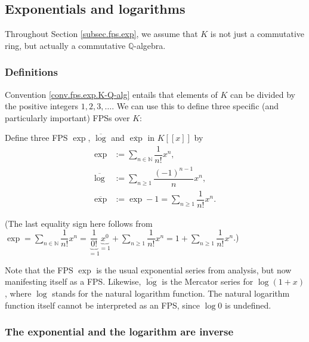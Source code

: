 \subsection{\label{subsec.fps.exp}Exponentials and logarithms}

\begin{convention}
\label{conv.fps.exp.K-Q-alg}Throughout Section \ref{subsec.fps.exp}, we assume
that $K$ is not just a commutative ring, but actually a commutative
$\mathbb{Q}$-algebra.
\end{convention}

\subsubsection{Definitions}

Convention \ref{conv.fps.exp.K-Q-alg} entails that elements of $K$ can be
divided by the positive integers $1,2,3,\ldots$. We can use this to define
three specific (and particularly important) FPSs over $K$:

\begin{definition}
\label{def.fps.exp-log}Define three FPS $\exp$, $\overline{\log}$ and
$\overline{\exp}$ in $K\left[  \left[  x\right]  \right]  $ by%
\begin{align*}
\exp &  :=\sum_{n\in\mathbb{N}}\dfrac{1}{n!}x^{n},\\
\overline{\log}  &  :=\sum_{n\geq1}\dfrac{\left(  -1\right)  ^{n-1}}{n}%
x^{n},\\
\overline{\exp}  &  :=\exp-1=\sum_{n\geq1}\dfrac{1}{n!}x^{n}.
\end{align*}


(The last equality sign here follows from $\exp=\sum_{n\in\mathbb{N}}\dfrac
{1}{n!}x^{n}=\underbrace{\dfrac{1}{0!}}_{=1}\underbrace{x^{0}}_{=1}%
+\sum_{n\geq1}\dfrac{1}{n!}x^{n}=1+\sum_{n\geq1}\dfrac{1}{n!}x^{n}$.)
\end{definition}

Note that the FPS $\exp$ is the usual exponential series from analysis, but
now manifesting itself as a FPS. Likewise, $\overline{\log}$ is the Mercator
series for $\log\left(  1+x\right)  $, where $\log$ stands for the natural
logarithm function. The natural logarithm function itself cannot be
interpreted as an FPS, since $\log0$ is undefined.

\subsubsection{The exponential and the logarithm are inverse}

